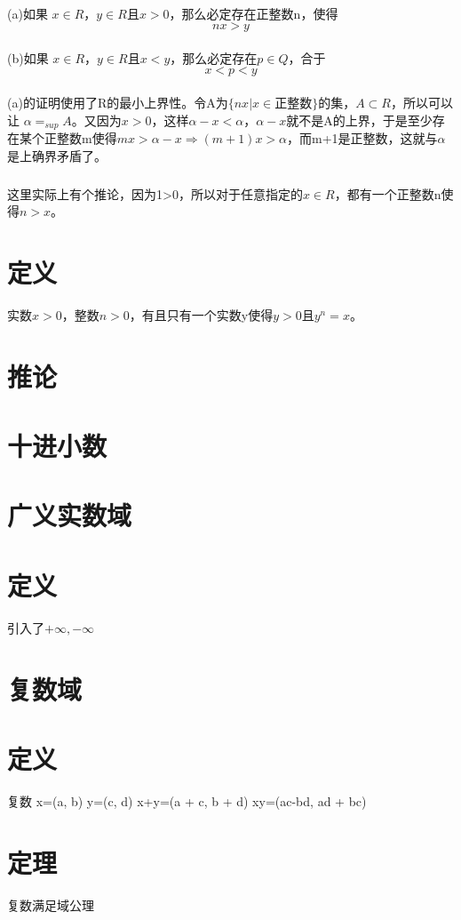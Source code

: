 \paragraph{}(a)如果 \(x \in R\)，\(y \in R\)且$ x > 0 $，那么必定存在正整数n，使得 $$ nx > y $$
\paragraph{}(b)如果 \(x \in R\)，\(y \in R\)且$ x < y $，那么必定存在$p \in Q$，合于 $$ x < p < y $$
\paragraph{}(a)的证明使用了R的最小上界性。令A为$\{ nx| x\in$正整数$\}$的集，$ A\subset R $，所以可以让 $ \alpha = _{sup}A $。又因为$x > 0$，这样$\alpha - x < \alpha$，$\alpha -x$就不是A的上界，于是至少存在某个正整数m使得$mx > \alpha-x \Rightarrow (m+1)x > \alpha$，而m+1是正整数，这就与$\alpha$是上确界矛盾了。
\subparagraph{}这里实际上有个推论，因为1>0，所以对于任意指定的$ x \in R $，都有一个正整数n使得$n>x$。
\section{定义} 实数$x > 0$，整数$n > 0$，有且只有一个实数y使得$y > 0$且$y^n = x$。
\section*{推论}
\section{十进小数}
\section*{广义实数域}
\section{定义}引入了$ +\infty, -\infty $
\section*{复数域}
\section{定义}复数
x=(a, b) y=(c, d)
x+y=(a + c, b + d)
xy=(ac-bd, ad + bc)
\section{定理}复数满足域公理
